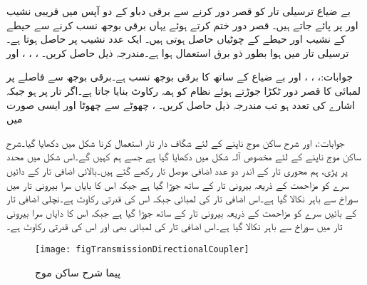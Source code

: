 بے ضیاع  ترسیلی تار کو قصر دور کرنے سے برقی دباو کے دو آپس میں قریبی نشیب  اور  پر پائے جاتے ہیں۔ قصر دور ختم کرتے ہوئے یہاں برقی بوجھ نسب کرنے سے  حیطے کے نشیب اور  حیطے کے چوٹیاں حاصل ہوتی ہیں۔ ایک عدد نشیب  پر حاصل ہوتا ہے۔ترسیلی تار میں ہوا بطور ذو برق استعمال ہوا ہے۔مندرجہ ذیل حاصل کریں۔ ، ، ،  اور 

جوابات:، ، ،
  اور 
بے ضیاع  کے ساتھ  کا برقی بوجھ نسب ہے۔برقی بوجھ سے  فاصلے پر  لمبائی کا قصر دور ٹکڑا جوڑتے ہوئے نظام کو ہمہ رکاوٹ بنایا جاتا ہے۔اگر تار پر  ہو جبکہ اشارے کی تعدد  ہو تب مندرجہ ذیل حاصل کریں۔ ، چھوٹے سے چھوٹا  اور ایسی صورت میں 

جوابات:،  اور 
شرح ساکن موج ناپنے کے لئے شگاف دار تار استعمال کرنا شکل  میں دکھایا گیا۔شرح ساکن موج ناپنے کے لئے مخصوص آلہ شکل  میں دکھایا گیا ہے جسے ہم  کہیں گے۔اس شکل میں  محدد پر پڑی، ہم محوری تار کے اندر دو عدد اضافی موصل تار رکھے گئے ہیں۔بالائی اضافی تار کے دائیں سرے کو مزاحمت  کے ذریعہ بیرونی تار کے ساتھ جوڑا گیا ہے جبکہ اس کا بایاں سرا بیرونی تار میں سوراخ سے باہر نکالا گیا ہے۔اس اضافی تار کی لمبائی  جبکہ اس کی قدرتی رکاوٹ  ہے۔نچلی اضافی تار کے بائیں سرے کو مزاحمت  کے ذریعہ بیرونی تار کے ساتھ جوڑا گیا ہے جبکہ اس کا دایاں سرا بیرونی تار میں سوراخ سے باہر نکالا گیا ہے۔اس اضافی تار کی لمبائی بھی  اور اس کی قدرتی رکاوٹ  ہے۔

\begin{figure}
\centering
\texttt{[image: figTransmissionDirectionalCoupler]}
\caption{پیما شرح ساکن موج}
\label{شکل_ترسیلی_آلہ_پیما_شرح_ساکن_موج}
\end{figure}

